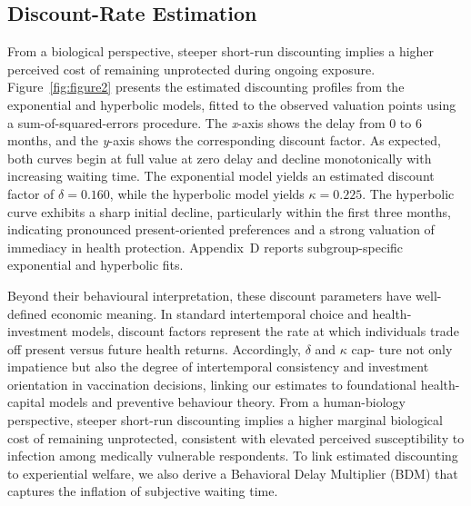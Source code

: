 \documentclass[preprint,12pt]{elsarticle}
\begin{document}
\clearpage

\subsection{Discount-Rate Estimation}

From a biological perspective, steeper short-run discounting implies a higher
perceived cost of remaining unprotected during ongoing exposure.
Figure~\ref{fig:figure2} presents the estimated discounting profiles from the exponential and
hyperbolic models, fitted to the observed valuation points using a
sum-of-squared-errors procedure. The \textit{x}-axis shows the delay from 0 to 6 months,
and the \textit{y}-axis shows the corresponding discount factor. As expected, both curves
begin at full value at zero delay and decline monotonically with increasing waiting time.
The exponential model yields an estimated discount factor of $\delta = 0.160$, while the
hyperbolic model yields $\kappa = 0.225$. The hyperbolic curve exhibits a sharp initial
decline, particularly within the first three months, indicating pronounced present-oriented
preferences and a strong valuation of immediacy in health protection. Appendix~D reports
subgroup-specific exponential and hyperbolic fits.

Beyond their behavioural interpretation, these discount parameters have
well-defined economic meaning. In standard intertemporal choice and health-
investment models, discount factors represent the rate at which individuals
trade off present versus future health returns. Accordingly, $\delta$ and $\kappa$ cap-
ture not only impatience but also the degree of intertemporal consistency
and investment orientation in vaccination decisions, linking our estimates to
foundational health-capital models and preventive behaviour theory.
From a human-biology perspective, steeper short-run discounting implies a higher marginal biological cost of remaining unprotected, consistent with elevated perceived susceptibility to infection among medically vulnerable respondents.
To link estimated discounting to experiential welfare, we also derive a Behavioral
Delay Multiplier (BDM) that captures the inflation of subjective waiting
time.
\end{document}
